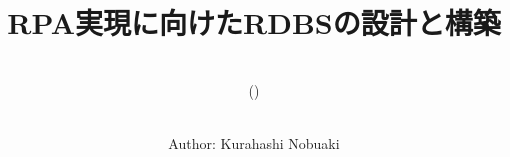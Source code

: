 
\titlehead{\hfill\small\customdate}

\subject{\Large--- プログラム作成業務の自動化 ---}

\title{\huge RPA実現に向けたRDBSの設計と構築}

\subtitle{\ \\(\thisdocumentversion)}

\date{}

\publishers{}

\author{\ \\\small Author: Kurahashi Nobuaki}

\uppertitleback{\small
This document was created using \TeX{} (\linkLaTeX\kern.15em2$_{\textstyle\varepsilon}$), specifically utilizing tools such as \linkTeXLive{} 2023, up\LaTeX, \linkBibLaTeX\ (\linkBiber), \linkupmendex, \linkPGFTikZ, and many useful packages.\\
The \TeX{} documents were edited using \linkTeXStudio{} and \linkSumatraPDF.\\
The analytical approximations were computed using \linkWolframAlpha.\\
Numerical calculations were performed using \linkExcel{}.\\%
The source codes for the G-code programs were written using \linkVSCode.\\
Version and issue control for these documents were managed using \linkGitHub{} and \linkGitHubDesktop.\\
Thanks to these tools, with the all-around support of  (\linkMicrosoftCopilot), the creation of the document and system was made possible,
even while navigating solo and finding my way in the quiet corners.
}

